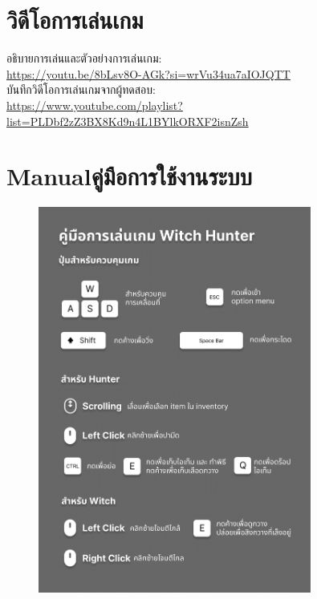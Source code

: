 \chapter{วิดีโอการเล่นเกม}

อธิบายการเล่นและตัวอย่างการเล่นเกม: \\
\url{https://youtu.be/8bLsv8O-AGk?si=wrVu34ua7aIOJQTT} \\
บันทึกวิดีโอการเล่นเกมจากผู้ทดสอบ: \\
\url{https://www.youtube.com/playlist?list=PLDbf2zZ3BX8Kd9n4L1BYlkORXF2isnZsh}

\chapter{\ifenglish Manual\else คู่มือการใช้งานระบบ\fi}

\begin{figure}[h]
    \begin{center}
        \includegraphics[width=0.8\textwidth]{img/Witch-Hunter-Manual.png}
    \end{center}
\end{figure}
